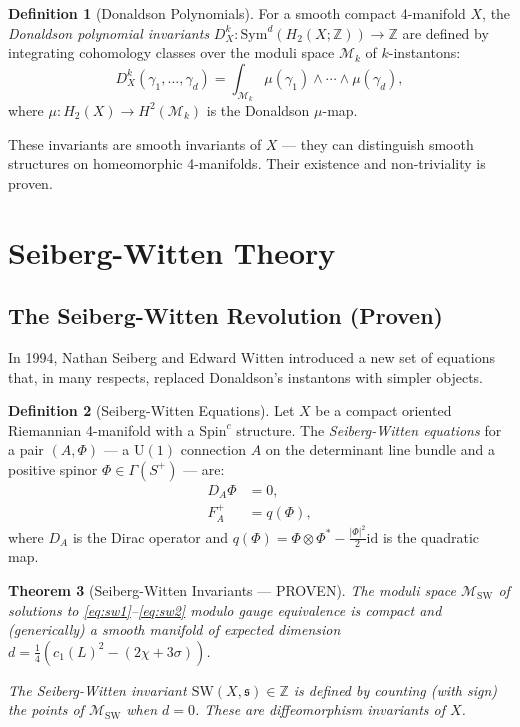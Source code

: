 \documentclass[12pt,a4paper]{amsart}
\newtheorem{theorem}{Theorem}[section]
\theoremstyle{definition}
\newtheorem{definition}[theorem]{Definition}
\theoremstyle{remark}
\begin{document}
\begin{definition}[Donaldson Polynomials]
For a smooth compact 4-manifold $X$, the \emph{Donaldson polynomial invariants}
$D^k_X: \mathrm{Sym}^d(H_2(X;\mathbb{Z})) \to \mathbb{Z}$ are defined by integrating
cohomology classes over the moduli space $\mathcal{M}_k$ of $k$-instantons:
\[
  D^k_X(\gamma_1, \ldots, \gamma_d) = \int_{\mathcal{M}_k} \mu(\gamma_1) \wedge \cdots \wedge \mu(\gamma_d),
\]
where $\mu: H_2(X) \to H^2(\mathcal{M}_k)$ is the Donaldson $\mu$-map.
\end{definition}

These invariants are smooth invariants of $X$ — they can distinguish smooth structures
on homeomorphic 4-manifolds. Their existence and non-triviality is proven.

\section{Seiberg-Witten Theory}
\label{sec:sw}

\subsection{The Seiberg-Witten Revolution (Proven)}

In 1994, Nathan Seiberg and Edward Witten \cite{SeibergWitten1994} introduced a new set
of equations that, in many respects, replaced Donaldson's instantons with simpler objects.

\begin{definition}[Seiberg-Witten Equations]
Let $X$ be a compact oriented Riemannian 4-manifold with a $\mathrm{Spin}^c$ structure.
The \emph{Seiberg-Witten equations} for a pair $(A, \Phi)$ — a $\mathrm{U}(1)$
connection $A$ on the determinant line bundle and a positive spinor $\Phi \in \Gamma(S^+)$ — are:
\begin{align}
  D_A \Phi &= 0, \label{eq:sw1} \\
  F_A^+ &= q(\Phi), \label{eq:sw2}
\end{align}
where $D_A$ is the Dirac operator and $q(\Phi) = \Phi \otimes \Phi^* - \frac{|\Phi|^2}{2} \mathrm{id}$
is the quadratic map.
\end{definition}

\begin{theorem}[Seiberg-Witten Invariants — PROVEN]
\label{thm:sw-invariants}
The moduli space $\mathcal{M}_{\mathrm{SW}}$ of solutions to \eqref{eq:sw1}--\eqref{eq:sw2}
modulo gauge equivalence is compact and (generically) a smooth manifold of expected
dimension $d = \frac{1}{4}(c_1(L)^2 - (2\chi + 3\sigma))$.

The \emph{Seiberg-Witten invariant} $\mathrm{SW}(X, \mathfrak{s}) \in \mathbb{Z}$ is
defined by counting (with sign) the points of $\mathcal{M}_{\mathrm{SW}}$ when $d = 0$.
These are diffeomorphism invariants of $X$.
\end{theorem}
\end{document}
